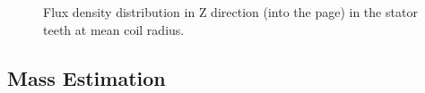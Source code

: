 \documentclass[12pt]{iopart}
\begin{document}
\begin{figure}[]
  \centering
  \hfill
   \caption{Flux density distribution in Z direction (into the page) in the stator teeth at mean coil radius.} 
    \label{10MW_tooth_Bz}
\end{figure}

\subsection{Mass Estimation}
\end{document}
